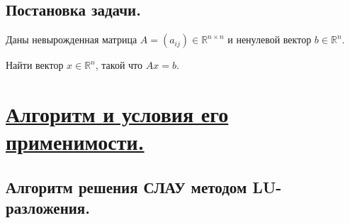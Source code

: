 \documentclass[a4paper, 12pt]{article}
\begin{document}
	\subsection{Постановка задачи.}
	
	Даны невырожденная матрица $A=(a_{ij})\in \mathbb{R}^{n\times n}$ и ненулевой вектор $b\in \mathbb{R}^n$.
	
	Найти вектор $x\in \mathbb{R}^n$, такой что $Ax=b$.
	
	\section{\underline{Алгоритм и условия его применимости.}}
	
	\subsection{Алгоритм решения СЛАУ методом LU-разложения.}
	
\end{document}

